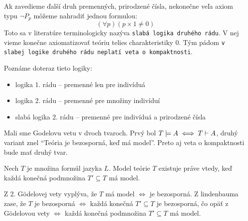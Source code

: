 \begin{poznamka}
    Ak zavedieme ďalší druh premenných, prirodzené čísla,
    nekonečne veľa axiom typu $\neg P_p$ môžeme nahradiť jednou formulou:
    \begin{equation*}
        (\forall p)(p\times 1\not=0)
    \end{equation*}
    Toto sa v literatúre terminologicky nazýva
    {\tt slabá logika druhého rádu}. V nej
    vieme konečne axiomatizovať teóriu telies charakteristiky 0.
    Tým pádom 
    {\tt v slabej logike druhého rádu neplatí veta o kompaktnosti}.
\end{poznamka}

\begin{poznamka}
    Poznáme doteraz tieto logiky:
    \begin{itemize}
    \item logika 1. rádu -- premenné len pre indivíduá
    \item logika 2. rádu -- premenné pre množiny indivíduí
    \item slabá logika 2. rádu -- premenné pre indivíduá a prirodzené
        čísla
    \end{itemize}
\end{poznamka}

\medskip \noindent
Mali sme Godelovu vetu v dvoch tvaroch. Prvý bol
$ T \models A \iff T \vdash A$, druhý variant znel 
``Teória je bezosporná, keď má model''.
Preto aj veta o kompaktnosti bude mať druhý tvar.

\begin{veta}
    Nech $T$ je množina formúl jazyka $L$. 
    Model teórie $T$ existuje práve vtedy, keď každá konečná podmnožina
    $T' \subseteq T$ má model.
\end{veta}

\begin{dokaz}
    Z 2. G\"odelovej vety vyplýva, že $T$ má model $\iff$ je bezosporná.
    Z lindenbauma zase, že $T$ je bezosporná $\iff$ každá konečná
    $T' \subseteq T$ je bezosporná, čo opäť z G\"odelovou vety
    $\iff$ každá konečná podmnožina $T' \subseteq T$ má model.
    \\
\end{dokaz}


